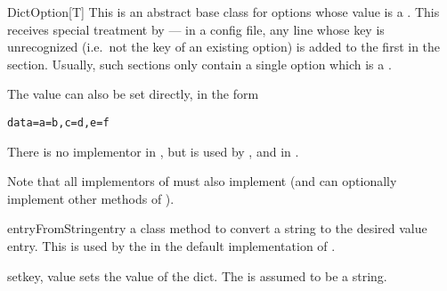 \begin{classdesc}{DictOption[T]}{}
  This is an abstract base class for options whose value is a
  . This receives special treatment by
   --- in a config file, any line whose key is
  unrecognized (i.e.\ not the key of an existing option) is added to the first
   in the section. Usually, such sections only contain a
  single option which is a .

  The value can also be set directly, in the form
\begin{verbatim}
data=a=b,c=d,e=f
\end{verbatim}

  There is no implementor in , but is used by
  ,  and  in
  .

  Note that all implementors of  must also implement
   (and can optionally implement other methods of
  ).
\end{classdesc}

\begin{methoddesc}[DictOption]{entryFromString}{entry}
  a class method to convert a string to the desired value entry. This is used
  by the in the default implementation of .
\end{methoddesc}

\begin{methoddesc}[DictOption]{set}{key, value}
  sets the value of the dict. The  is assumed to be a string.
\end{methoddesc}
